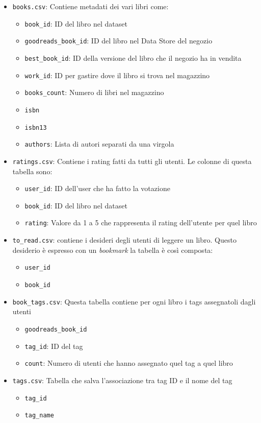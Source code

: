 \documentclass[11pt]{article}
\begin{document}
\begin{itemize}
    \item \texttt{books.csv}: Contiene metadati dei vari libri come:
    \begin{itemize}
        \item \texttt{book\_id}: ID del libro nel dataset
        \item \texttt{goodreads\_book\_id}: ID del libro nel Data Store del negozio
        \item \texttt{best\_book\_id}: ID della versione del libro che il negozio ha in vendita
        \item \texttt{work\_id}: ID per gastire dove il libro si trova nel magazzino
        \item \texttt{books\_count}: Numero di libri nel magazzino
        \item \texttt{isbn}
        \item \texttt{isbn13}
        \item \texttt{authors}: Lista di autori separati da una virgola
    \end{itemize}
    \item \texttt{ratings.csv}: Contiene i rating fatti da tutti gli utenti. Le colonne di questa tabella sono:
    \begin{itemize}
        \item \texttt{user\_id}: ID dell'user che ha fatto la votazione
        \item \texttt{book\_id}: ID del libro nel dataset
        \item \texttt{rating}: Valore da 1 a 5 che rappresenta il rating dell'utente per quel libro
    \end{itemize}
    \item \texttt{to\_read.csv}: contiene i desideri degli utenti di leggere un libro. Questo desiderio è espresso con un \textit{bookmark}
            la tabella è così composta:
    \begin{itemize}
        \item \texttt{user\_id}
        \item \texttt{book\_id}
    \end{itemize}
    \item \texttt{book\_tags.csv}: Questa tabella contiene per ogni libro i tags assegnatoli dagli utenti
    \begin{itemize}
        \item \texttt{goodreads\_book\_id}
        \item \texttt{tag\_id}: ID del tag
        \item \texttt{count}: Numero di utenti che hanno assegnato quel tag a quel libro
    \end{itemize}
    \item \texttt{tags.csv}: Tabella che salva l'associazione tra tag ID e il nome del tag
    \begin{itemize}
        \item \texttt{tag\_id}
        \item \texttt{tag\_name}
    \end{itemize}
\end{itemize}
\end{document}
